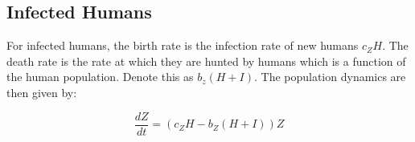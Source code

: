 \documentclass[
	12pt
]{article}
\begin{document}
\subsection{Infected Humans}

For infected humans, the birth rate is the infection rate of new humans $c_ZH$. The death rate is the rate at which they are hunted by humans which is a function of the human population. Denote this as $b_z(H+I)$. The population dynamics are then given by:

\begin{equation}
\frac{dZ}{dt} = (c_ZH-b_Z(H+I))Z
\end{equation}
\end{document}
